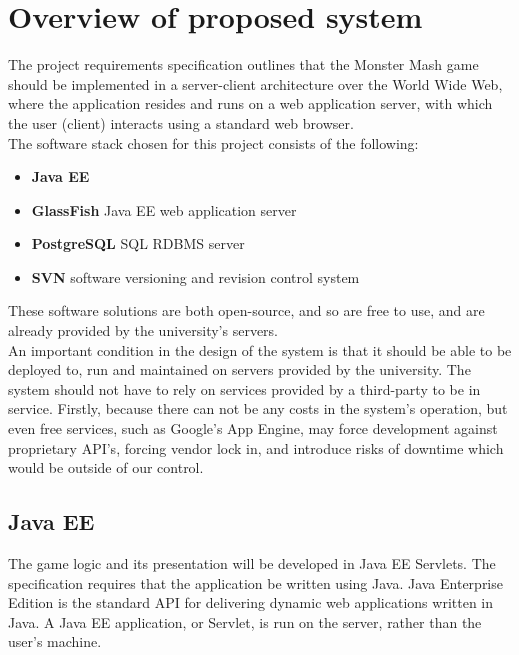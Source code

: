 \documentclass[a4paper]{article}
\begin{document}

\section{Overview of proposed system}
The project requirements specification outlines that the Monster Mash game should be implemented in a server-client architecture over the World Wide Web, where the application resides and runs on a web application server, with which the user (client) interacts using a standard web browser.\\

The software stack chosen for this project consists of the following:
\begin{itemize}
\item \textbf{Java EE}
\item \textbf{GlassFish} Java EE web application server
\item \textbf{PostgreSQL} SQL RDBMS server
\item \textbf{SVN} software versioning and revision control system
\end{itemize}

These software solutions are both open-source, and so are free to use, and are already provided by the university's servers.\\

An important condition in the design of the system is that it should be able to be deployed to, run and maintained on servers provided by the university. The system should not have to rely on services provided by a third-party to be in service. Firstly, because there can not be any costs in the system's operation, but even free services, such as Google's App Engine, may force development against proprietary API's, forcing vendor lock in, and introduce risks of downtime which would be outside of our control.

\subsection{Java EE}

The game logic and its presentation will be developed in Java EE Servlets. The specification requires that the application be written using Java. Java Enterprise Edition is the standard API for delivering dynamic web applications written in Java. A Java EE application, or Servlet, is run on the server, rather than the user's machine.\\
\end{document}
